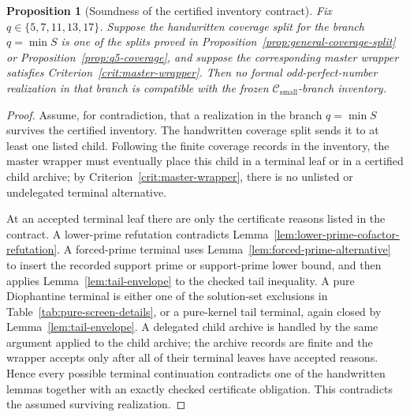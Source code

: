 \documentclass[11pt]{article}
\newtheorem{proposition}[theorem]{Proposition}
\theoremstyle{definition}
\theoremstyle{remark}
\newcommand{\Csmall}{\ensuremath{\mathcal C_{\mathrm{small}}}}
\begin{document}
\begin{proposition}[Soundness of the certified inventory contract]
\label{prop:certified-inventory-soundness}
Fix \(q\in\{5,7,11,13,17\}\).  Suppose the handwritten coverage split for the
branch \(q=\min S\) is one of the splits proved in
Proposition~\ref{prop:general-coverage-split} or
Proposition~\ref{prop:q5-coverage}, and suppose the corresponding master
wrapper satisfies Criterion~\ref{crit:master-wrapper}.  Then no formal
odd-perfect-number realization in that branch is compatible with the frozen
\(\Csmall\)-branch inventory.
\end{proposition}

\begin{proof}
Assume, for contradiction, that a realization in the branch \(q=\min S\)
survives the certified inventory.  The handwritten coverage split sends it to
at least one listed child.  Following the finite coverage records in the
inventory, the master wrapper must eventually place this child in a terminal
leaf or in a certified child archive; by Criterion~\ref{crit:master-wrapper},
there is no unlisted or undelegated terminal alternative.

At an accepted terminal leaf there are only the certificate reasons listed in
the contract.  A lower-prime refutation contradicts
Lemma~\ref{lem:lower-prime-cofactor-refutation}.  A forced-prime terminal
uses Lemma~\ref{lem:forced-prime-alternative} to insert the recorded support
prime or support-prime lower bound, and then applies
Lemma~\ref{lem:tail-envelope} to the checked tail inequality.  A pure
Diophantine terminal is either one of the solution-set exclusions in
Table~\ref{tab:pure-screen-details}, or a pure-kernel tail terminal, again
closed by Lemma~\ref{lem:tail-envelope}.  A delegated child archive is handled
by the same argument applied to the child archive; the archive records are
finite and the wrapper accepts only after all of their terminal leaves have
accepted reasons.  Hence every possible terminal continuation contradicts one
of the handwritten lemmas together with an exactly checked certificate
obligation.  This contradicts the assumed surviving realization.
\end{proof}
\end{document}
